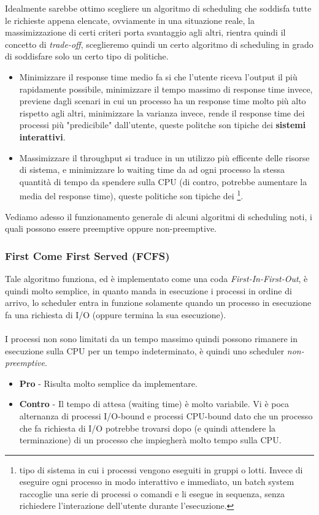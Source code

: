 \documentclass[12pt, letterpaper]{article}
\newcommand{\acc}{\\\hphantom{}\\}
\begin{document}
Idealmente sarebbe ottimo scegliere un algoritmo di scheduling che soddisfa 
tutte le richieste appena elencate, ovviamente in una situazione reale, la 
massimizzazione di certi criteri porta svantaggio agli altri, rientra 
quindi il concetto di \textit{trade-off}, sceglieremo quindi un certo 
algoritmo di scheduling in grado di soddisfare solo un certo tipo di 
politiche.\begin{itemize}
    \item Minimizzare il response time medio fa si che l'utente 
    riceva l'output il più rapidamente possibile, minimizzare il tempo massimo 
    di response time invece, previene dagli scenari in cui un processo 
    ha un response time molto più alto rispetto agli altri, minimizzare 
    la varianza invece, rende il response time dei processi più "predicibile" 
    dall'utente, queste politche son tipiche dei \textbf{sistemi interattivi}.
    \item Massimizzare il throughput si traduce in un utilizzo più efficente 
    delle risorse di sistema, e minimizzare lo waiting time da ad ogni processo 
    la stessa quantità di tempo da spendere sulla CPU (di contro, potrebbe 
    aumentare la media del response time), queste politiche son tipiche 
    dei \footnote{
        tipo di sistema in cui i processi vengono eseguiti  in gruppi o lotti. Invece di eseguire ogni processo in modo interattivo e immediato, un batch system raccoglie una serie di processi o comandi e li esegue in sequenza, senza richiedere l’interazione dell’utente durante l’esecuzione.
    }.
\end{itemize}
Vediamo adesso il funzionamento generale di alcuni algoritmi di scheduling noti,
i quali possono essere preemptive oppure non-preemptive.
\subsubsection{First Come First Served (FCFS)}
Tale algoritmo funziona, ed è implementato come una coda 
\textit{First-In-First-Out}, è quindi molto semplice, in quanto manda 
in esecuzione i processi in ordine di arrivo, lo scheduler entra in funzione 
solamente quando un processo in esecuzione fa una richiesta 
di I/O (oppure termina la sua esecuzione).\acc I processi non sono limitati 
da un tempo massimo quindi possono rimanere in esecuzione sulla CPU 
per un tempo indeterminato, è quindi uno scheduler \textit{non-preemptive}. 
\begin{itemize}
    \item \textbf{Pro} - Risulta molto semplice da implementare.
    \item \textbf{Contro} - Il tempo di attesa (waiting time) è molto 
    variabile. Vi è poca alternanza di processi I/O-bound e processi 
    CPU-bound dato che un processo che fa richiesta di I/O potrebbe trovarsi 
    dopo (e quindi attendere la terminazione) di un processo che 
    impiegherà molto tempo sulla CPU.
\end{itemize}
\end{document}
